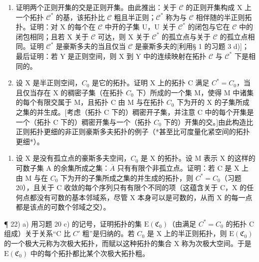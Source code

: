 \begin{enumerate}
\def\labelenumi{\alph{enumi})}
\setcounter{enumi}{1}
\item
  证明两个正则开集的交是正则开集。由此推出：关于 \(\mathcal{C}\) 的正则开集构成 X 上一个拓扑 \(\mathcal{C}^*\) 的基，该拓扑比 \(\mathcal{C}\) 粗且半正则；\(\mathcal{C}^*\) 称为与 \(\mathcal{C}\) 相伴随的半正则拓扑。证明：对 X 的每个在 \(\mathcal{C}\) 中开的子集 U，U 关于 \(\mathcal{C}^*\) 的闭包与它在 \(\mathcal{C}\) 中的闭包相同；且若 X 关于 \(\mathcal{C}\) 可达，则 X 关于 \(\mathcal{C}^*\) 的孤立点与关于 \(\mathcal{C}\) 的孤立点相同。证明 \(\mathcal{C}^*\) 是豪斯多夫的当且仅当 \(\mathcal{C}\) 是豪斯多夫的{[}利用§ 1 的习题 3 d){]}；最后证明：若 Y 是正则空间，则 X 到 Y 中的连续映射在拓扑 \(\mathcal{C}\) 与 \(\mathcal{C}^*\) 下是相同的。
\item
  设 X 是半正则空间，\(C_{0}\) 是它的拓扑。证明 X 上的拓扑 C 满足 \(C^{*} = C_{0}\)，当且仅当存在 X 的稠密子集（在拓扑 \(C_{0}\) 下）所成的一个集 M，使得 M 中诸集的每个有限交属于 M，且拓扑 C 由 M 与在拓扑 \(C_{0}\) 下为开的 X 的子集所成之集的并生成。{[}考虑（拓扑 C 下的）稠密开子集，并注意 C 中的每个开集是一个（拓扑 C 下的）稠密开集与一个（拓扑 \(C_{0}\) 下的）开集的交。{]}由此构造比正则拓扑更细的非正则豪斯多夫拓扑的例子（*甚至比可度量化紧空间的拓扑更细*）。
\end{enumerate}

\begin{enumerate}
\def\labelenumi{\arabic{enumi})}
\setcounter{enumi}{20}
\tightlist
\item
  设 X 是没有孤立点的豪斯多夫空间，\(C_{0}\) 是 X 的拓扑。设 M 表示 X 的这样的可数子集 A 的余集所成之集：\(\overline{A}\) 只有有限个非孤立点。证明：若 C 是 X 上由 M 与在 \(C_{0}\) 下为开的子集所成之集的并生成的拓扑，则 \(C^{*} = C_{0}\)（习题 20），且关于 C 收敛的每个序列只有有限个不同的项（这蕴含关于 C，X 的任何点都没有可数的基本邻域系，尽管 X 本身可以是可数的，从而 X 的每一点都是该点的可数个邻域之交）。
\end{enumerate}

¶ 22) a) 用习题 20 c) 的记号，证明拓扑的集 \(\mathrm{E}(\mathfrak{C}_{0})\)（由满足 \(C^{*}=C_{0}\) 的拓扑 C 组成）关于关系“C 比 \(C'\) 粗”是归纳的。若 \(C_{0}\) 是 X 上的半正则拓扑，则 \(\mathrm{E}(\mathfrak{C}_{0})\) 的一个极大元称为次极大拓扑，而赋以这种拓扑的集合 X 称为次极大空间。于是 \(\mathrm{E}(\mathfrak{C}_{0})\) 中的每个拓扑都比某个次极大拓扑粗。

